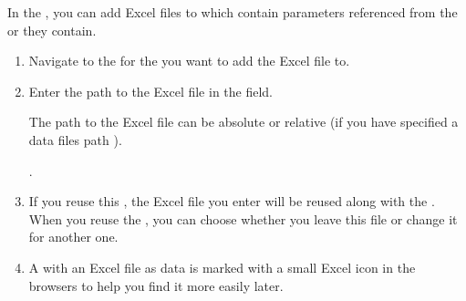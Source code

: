 In the \gdpropview{}, you can add Excel files to \gdcases{} which contain parameters referenced from the \gdcases{} or \gdsteps{} they contain. 
\begin{enumerate}
\item Navigate to the \gdpropview{} for the \gdcase{} you want to add the Excel file to. 
\item Enter the path to the Excel file in the  field. 

The path to the Excel file can be absolute or relative (if you have specified a data files path ).

.

\item If you reuse this \gdcase{}, the Excel file you enter will be reused along with the \gdcase{}. When you reuse the \gdcase{}, you can choose whether you leave this file or change it for another one. 
\item A \gdcase{} with an Excel file as data is marked with a small Excel icon in the browsers to help you find it more easily later. 
\end{enumerate}

